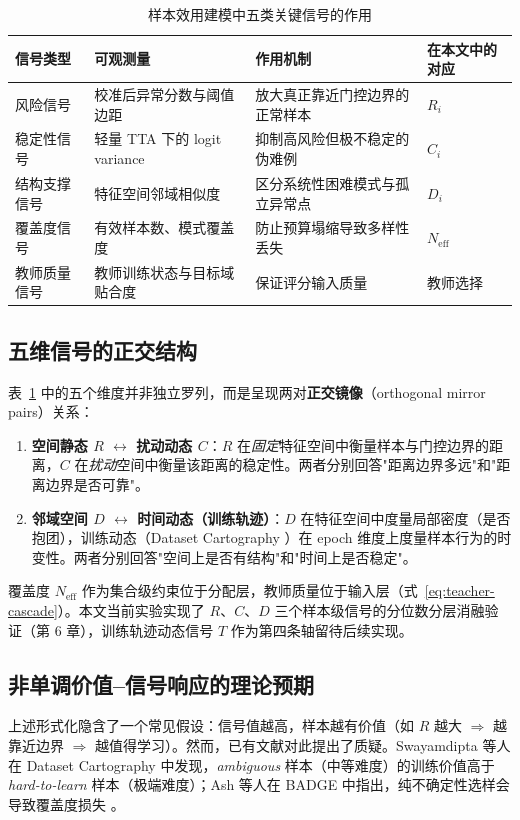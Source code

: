 \documentclass[UTF8,openany,12pt]{ctexbook}
\begin{document}
\begin{table}[H]
    \centering
    \caption{样本效用建模中五类关键信号的作用}
    \label{tab:sample-valuation-signals}
    \begin{tabularx}{\textwidth}{p{2.4cm}p{3.0cm}Xp{2.0cm}}
        \toprule
        信号类型 & 可观测量 & 作用机制 & 在本文中的对应 \\
        \midrule
        风险信号 & 校准后异常分数与阈值边距 & 放大真正靠近门控边界的正常样本 & $R_i$ \\
        稳定性信号 & 轻量 TTA 下的 logit variance & 抑制高风险但极不稳定的伪难例 & $C_i$ \\
        结构支撑信号 & 特征空间邻域相似度 & 区分系统性困难模式与孤立异常点 & $D_i$ \\
        覆盖度信号 & 有效样本数、模式覆盖度 & 防止预算塌缩导致多样性丢失 & $N_{\mathrm{eff}}$ \\
        教师质量信号 & 教师训练状态与目标域贴合度 & 保证评分输入质量 & 教师选择 \\
        \bottomrule
    \end{tabularx}
\end{table}

\subsection{五维信号的正交结构}
表~\ref{tab:sample-valuation-signals} 中的五个维度并非独立罗列，而是呈现两对\textbf{正交镜像}（orthogonal mirror pairs）关系：

\begin{enumerate}[leftmargin=2em,nosep]
\item \textbf{空间静态 $R$ $\leftrightarrow$ 扰动动态 $C$}：$R$ 在\emph{固定}特征空间中衡量样本与门控边界的距离，$C$ 在\emph{扰动}空间中衡量该距离的稳定性。两者分别回答"距离边界多远"和"距离边界是否可靠"。
\item \textbf{邻域空间 $D$ $\leftrightarrow$ 时间动态（训练轨迹）}：$D$ 在特征空间中度量局部密度（是否抱团），训练动态（Dataset Cartography \cite{swayamdipta2020cartography}）在 epoch 维度上度量样本行为的时变性。两者分别回答"空间上是否有结构"和"时间上是否稳定"。
\end{enumerate}

\noindent 覆盖度 $N_\mathrm{eff}$ 作为集合级约束位于分配层，教师质量位于输入层（式~\eqref{eq:teacher-cascade}）。本文当前实验实现了 $R$、$C$、$D$ 三个样本级信号的分位数分层消融验证（第 6 章），训练轨迹动态信号 $T$ 作为第四条轴留待后续实现。

\subsection{非单调价值--信号响应的理论预期}
上述形式化隐含了一个常见假设：信号值越高，样本越有价值（如 $R$ 越大 $\Rightarrow$ 越靠近边界 $\Rightarrow$ 越值得学习）。然而，已有文献对此提出了质疑。Swayamdipta 等人在 Dataset Cartography 中发现，\emph{ambiguous} 样本（中等难度）的训练价值高于 \emph{hard-to-learn} 样本（极端难度）\cite{swayamdipta2020cartography}；Ash 等人在 BADGE 中指出，纯不确定性选样会导致覆盖度损失 \cite{ash2020badge}。
\end{document}
